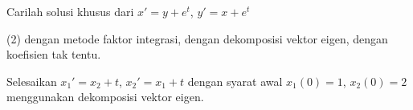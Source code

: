\begin{exercise}
Carilah solusi khusus dari $x' = y + e^t$, $y' = x +e^t$
\begin{tasks}(2)
\task dengan metode faktor integrasi,
\task dengan dekomposisi vektor eigen,
\task dengan koefisien tak tentu.
\end{tasks}
\end{exercise}

\begin{exercise}
Selesaikan
$x_1' = x_2 + t$, $x_2' = x_1 +t$ dengan syarat awal
$x_1(0) = 1$, $x_2(0) = 2$
menggunakan dekomposisi vektor eigen.
\end{exercise}

